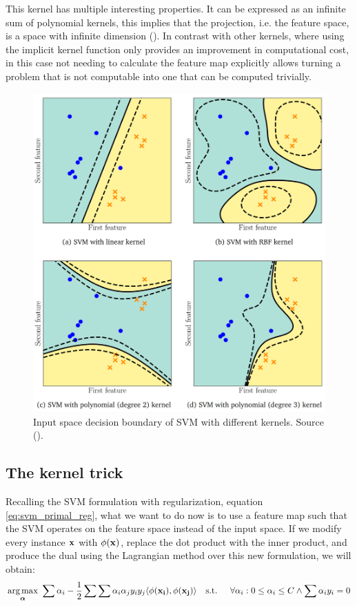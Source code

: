 This kernel has multiple interesting properties. It can be expressed as an infinite sum of polynomial kernels, this implies that the projection, i.e. the feature space, is a space with infinite dimension (\cite{bernstein_radial_2017}). In contrast with other kernels, where using the implicit kernel function only provides an improvement in com\-pu\-ta\-tion\-al cost, in this case not needing to calculate the feature map explicitly allows turning a problem that is not computable into one that can be computed trivially.

\begin{figure}[h]
    \centering
    \includegraphics[width=0.7\linewidth]{img/ch4/kernels.png}
    \caption[Decision boundary with non-linear kernel comparison]{Input space decision boundary of SVM with different kernels. Source (\cite{deisenroth_mathematics_2020}).}
    \label{fig:ch4.kernels}
\end{figure}


\subsection{The kernel trick}

Recalling the SVM formulation with regularization, equation \ref{eq:svm_primal_reg}, what we want to do now is to use a feature map such that the SVM operates on the feature space instead of the input space. If we modify every instance $\mathbf{x}$ with $\phi(\mathbf{x})$, replace the dot product with the inner product, and produce the dual using the Lagrangian method over this new formulation, we will obtain:
\begin{align*}
    \underset{\boldsymbol{\alpha}}{\text{arg} \max}\ \sum \alpha_i - \frac{1}{2} \sum \sum \alpha_i \alpha_j y_i y_j \langle\phi(\mathbf{x_i}), \phi(\mathbf{x_j})\rangle
    \text{\quad s.t. \quad} \forall \alpha_i : 0 \le \alpha_i \le C \land \sum \alpha_i y_i = 0
\end{align*}

